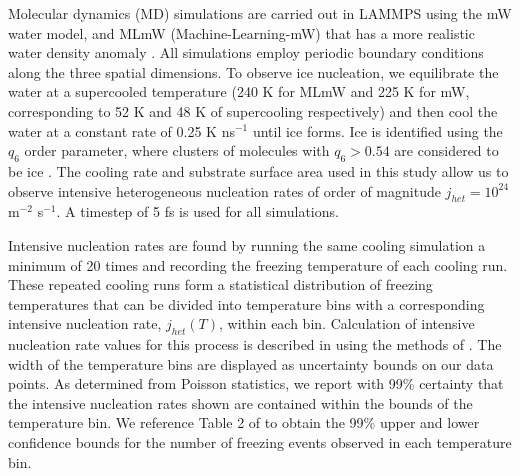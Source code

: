 \documentclass[journal abbreviation, manuscript]{copernicus}
\begin{document}
Molecular dynamics (MD) simulations are carried out in LAMMPS \citep{plimpton1995} using the mW \citep{molinero2009} water model, and MLmW (Machine-Learning-mW) that has a more realistic water density anomaly \citep{chan2019}. All simulations employ periodic boundary conditions along the three spatial dimensions. To observe ice nucleation, we equilibrate the water at a supercooled temperature (240 K for MLmW and 225 K for mW, corresponding to 52 K and 48 K of supercooling respectively) and then cool the water at a constant rate of 0.25 K ns$^{-1}$ until ice forms. Ice is identified using the $q_6$ order parameter, where clusters of molecules with $q_6 > 0.54$ are considered to be ice \citep{steinhardt1983,lupi2014,rosky2022}. The cooling rate and substrate surface area used in this study allow us to observe intensive heterogeneous nucleation rates of order of magnitude $j_{het} = 10^{24}$ m$^{-2}$ s$^{-1}$. A timestep of 5 fs is used for all simulations.

Intensive nucleation rates are found by running the same cooling simulation a minimum of 20 times and recording the freezing temperature of each cooling run. These repeated cooling runs form a statistical distribution of freezing temperatures that can be divided into temperature bins with a corresponding intensive nucleation rate, $j_{het}(T)$, within each bin. Calculation of intensive nucleation rate values for this process is described in \citet{rosky2022} using the methods of \citet{zobrist2007}. The width of the temperature bins are displayed as uncertainty bounds on our data points. As determined from Poisson statistics, we report with 99\% certainty that the intensive nucleation rates shown are contained within the bounds of the temperature bin. We reference Table 2 of \citet{koop1997} to obtain the 99\% upper and lower confidence bounds for the number of freezing events observed in each temperature bin.
\end{document}
